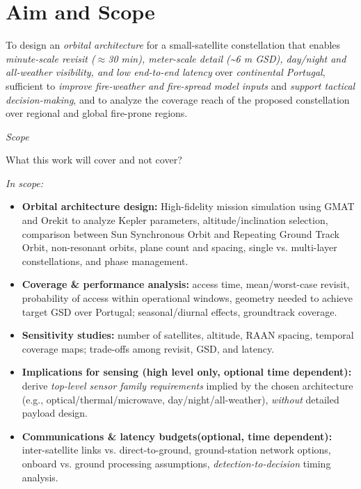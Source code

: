 \section{Aim and Scope}\label{sec:aim-and-scope}

\begin{tcolorbox}[colback=white, colframe=black, title=\textbf{Aim}\label{aim}]
To design an \emph{orbital architecture} for a small-satellite constellation that enables \emph{minute-scale revisit ($\approx$30 min), meter-scale detail (\textasciitilde6 m GSD), day/night and all-weather	visibility, and low end-to-end latency} over \emph{continental Portugal}, sufficient to \emph{improve fire-weather and fire-spread model inputs} and \emph{support tactical decision-making}, and to analyze the coverage reach of the proposed constellation over regional and global fire-prone regions.
\end{tcolorbox}

\emph{Scope}\label{scope}

What this work will cover and not cover?
\vspace{1.5em}

\emph{In scope:}

\begin{itemize}
	\item
	      \textbf{Orbital architecture design:} High-fidelity mission simulation using  GMAT and Orekit to analyze Kepler parameters, altitude/inclination selection, comparison between Sun Synchronous Orbit and Repeating Ground Track Orbit, non-resonant orbits, plane count and spacing, single vs. multi-layer constellations, and phase management.
	\item
	      \textbf{Coverage \& performance analysis:} access time, mean/worst-case revisit, probability of access within operational windows, geometry needed to achieve target GSD over Portugal; seasonal/diurnal effects, groundtrack coverage.
	\item
	      \textbf{Sensitivity studies:} number of satellites, altitude, RAAN
	      spacing, temporal coverage maps; trade-offs among revisit, GSD, and
	      latency.
	\item
	      \textbf{Implications for sensing (high level only, optional time dependent):} derive
	      \emph{top-level sensor family requirements} implied by the chosen
	      architecture (e.g., optical/thermal/microwave, day/night/all-weather),
	      \emph{without} detailed payload design.
        \item
          \textbf{Communications \& latency budgets(optional, time dependent):}
          inter-satellite links vs. direct-to-ground, ground-station network
          options, onboard vs. ground processing assumptions,
          \emph{detection-to-decision} timing analysis.
\end{itemize}

